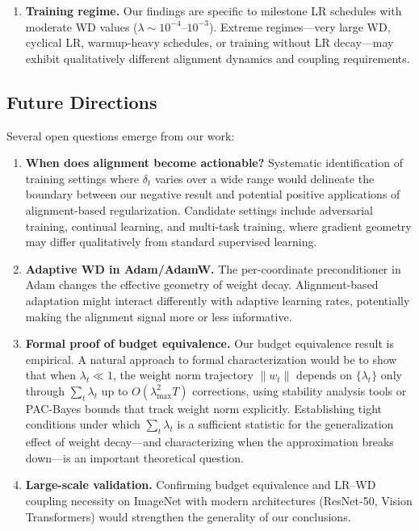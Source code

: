 \documentclass{article}
\begin{document}
\begin{enumerate}
  \item \textbf{Training regime.}
        Our findings are specific to milestone LR schedules with moderate WD values
        ($\lambda \sim 10^{-4}$--$10^{-3}$).
        Extreme regimes---very large WD, cyclical LR, warmup-heavy schedules, or
        training without LR decay---may exhibit qualitatively different alignment
        dynamics and coupling requirements.
\end{enumerate}

\subsection{Future Directions}
\label{sec:future}

Several open questions emerge from our work:

\begin{enumerate}
  \item \textbf{When does alignment become actionable?}
        Systematic identification of training settings where $\delta_t$ varies over a
        wide range would delineate the boundary between our negative result and
        potential positive applications of alignment-based regularization.
        Candidate settings include adversarial training, continual learning, and
        multi-task training, where gradient geometry may differ qualitatively from
        standard supervised learning.

  \item \textbf{Adaptive WD in Adam/AdamW.}
        The per-coordinate preconditioner in Adam changes the effective geometry of
        weight decay.
        Alignment-based adaptation might interact differently with adaptive learning
        rates, potentially making the alignment signal more or less informative.

  \item \textbf{Formal proof of budget equivalence.}
        Our budget equivalence result is empirical.
        A natural approach to formal characterization would be to show that when
        $\lambda_t \ll 1$, the weight norm trajectory $\|w_t\|$ depends on
        $\{\lambda_t\}$ only through $\sum_t \lambda_t$ up to
        $O(\lambda_{\max}^2 T)$ corrections, using stability analysis tools
        \citep{hardt2016train} or PAC-Bayes bounds that track weight norm explicitly.
        Establishing tight conditions under which $\sum_t \lambda_t$ is a sufficient
        statistic for the generalization effect of weight decay---and characterizing
        when the approximation breaks down---is an important theoretical question.

  \item \textbf{Large-scale validation.}
        Confirming budget equivalence and LR--WD coupling necessity on ImageNet with
        modern architectures (ResNet-50, Vision Transformers) would strengthen the
        generality of our conclusions.
\end{enumerate}
\end{document}
